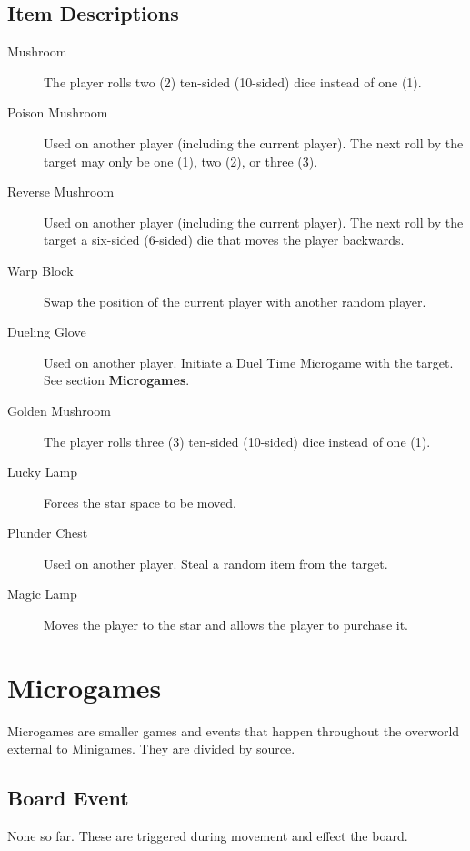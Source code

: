 \documentclass{article}
\begin{document}
\subsection{Item Descriptions}
\begin{description}
\item[Mushroom] The player rolls two (2) ten-sided (10-sided) dice instead
of one (1).

\item[Poison Mushroom] Used on another player (including the current player).
The next roll by the target may only be one (1), two (2), or three (3).

\item[Reverse Mushroom] Used on another player (including the current player).
The next roll by the target a six-sided (6-sided) die that moves the player backwards.

\item[Warp Block] Swap the position of the current player with another random player.

\item[Dueling Glove] Used on another player. Initiate a Duel Time Microgame with the target.
See section \textbf{Microgames}.

\item[Golden Mushroom] The player rolls three (3) ten-sided (10-sided) dice instead
of one (1).

\item[Lucky Lamp] Forces the star space to be moved.

\item[Plunder Chest] Used on another player. Steal a random item from the target.

\item[Magic Lamp] Moves the player to the star and allows the player to purchase it.
\end{description}

\section{Microgames}

Microgames are smaller games and events that happen throughout the overworld external
to Minigames.  They are divided by source.

\subsection{Board Event}

None so far. These are triggered during movement and effect the board.
\end{document}
